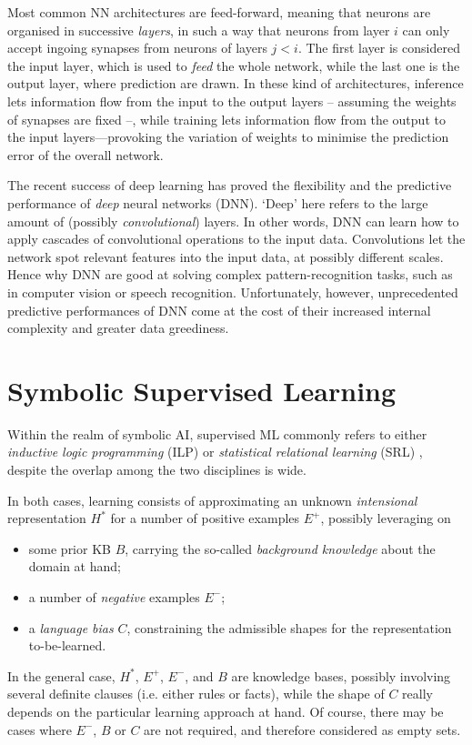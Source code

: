 \documentclass[12pt,a4paper,openright,twoside]{book}
\begin{document}
Most common NN architectures are feed-forward, meaning that neurons are organised in successive \emph{layers}, in such a way that neurons from layer $i$ can only accept ingoing synapses from neurons of layers $j < i$.
%
The first layer is considered the input layer, which is used to \emph{feed} the whole network, while the last one is the output layer, where prediction are drawn.
%
In these kind of architectures, inference lets information flow from the input to the output layers -- assuming the weights of synapses are fixed --, while training lets information flow from the output to the input layers---provoking the variation of weights to minimise the prediction error of the overall network.

The recent success of deep learning \cite{GoodfellowBC2016} has proved the flexibility and the predictive performance of \emph{deep} neural networks (DNN).
%
`Deep' here refers to the large amount of (possibly \emph{convolutional}) layers.
%
In other words, DNN can learn how to apply cascades of convolutional operations to the input data.
%
Convolutions let the network spot relevant features into the input data, at possibly different scales.
%
Hence why DNN are good at solving complex pattern-recognition tasks, such as in computer vision or speech recognition.
%
Unfortunately, however, unprecedented predictive performances of DNN come at the cost of their increased internal complexity and greater data greediness.

\section{Symbolic Supervised Learning}

Within the realm of symbolic AI, supervised ML commonly refers to either \emph{inductive logic programming} (ILP) \cite{Muggleton91} or \emph{statistical relational learning} (SRL) \cite{DeRaedt2010}, despite the overlap among the two disciplines is wide.

In both cases, learning consists of approximating an unknown \emph{intensional} representation $H^*$ for a number of positive examples $E^+$, possibly leveraging on
%
\begin{itemize}
    \item some prior KB $B$, carrying the so-called \emph{background knowledge} about the domain at hand;
    \item a number of \emph{negative} examples $E^-$;
    \item a \emph{language bias} $C$, constraining the admissible shapes for the representation to-be-learned.
\end{itemize}
%
In the general case, $H^*$, $E^+$, $E^-$, and $B$ are knowledge bases, possibly involving several definite clauses (i.e. either rules or facts), while the shape of $C$ really depends on the particular learning approach at hand.
%
Of course, there may be cases where $E^-$, $B$ or $C$ are not required, and therefore considered as empty sets.
\end{document}
